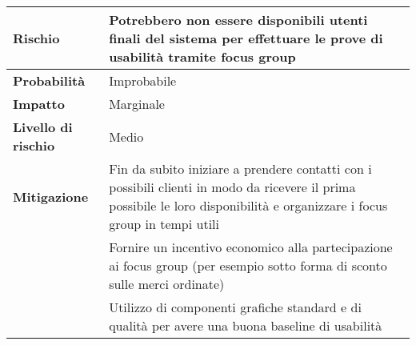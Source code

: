 \begin{table}[H]
  \begin{tabularx}{\textwidth}{lX}
    \toprule
    \textbf{Rischio}            & \textbf{Potrebbero non essere disponibili utenti finali del sistema per effettuare le prove di usabilità tramite focus group}                                              \\
    \midrule
    \textbf{Probabilità}        & Improbabile                                                                                                                                                                \\
    \textbf{Impatto}            & Marginale                                                                                                                                                                  \\
    \textbf{Livello di rischio} & Medio                                                                                                                                                                      \\
    \textbf{Mitigazione}        & Fin da subito iniziare a prendere contatti con i possibili clienti in modo da ricevere il prima possibile le loro disponibilità e organizzare i focus group in tempi utili \\
                                & Fornire un incentivo economico alla partecipazione ai focus group (per esempio sotto forma di sconto sulle merci ordinate)                                                 \\
                                & Utilizzo di componenti grafiche standard e di qualità per avere una buona baseline di usabilità                                                                            \\
    \bottomrule
  \end{tabularx}
\end{table}
